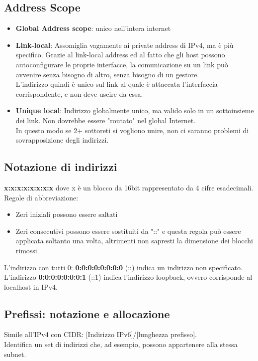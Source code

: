 \documentclass{article}
\begin{document}
\subsection{Address Scope}
\begin{itemize}
    \item \textbf{Global Address scope}: unico nell'intera internet
    \item \textbf{Link-local}: Assomiglia vagamente ai private address di IPv4, ma è più specifico. Grazie al link-local address ed al fatto che gli host possono autoconfigurare le proprie interfacce, la comunicazione su un link può avvenire senza bisogno di altro, senza bisogno di un gestore.\\
    L'indirizzo quindi è unico sul link al quale è attaccata l'interfaccia corrispondente, e non deve uscire da essa. 
    \item \textbf{Unique local}: Indirizzo globalmente unico, ma valido solo in un sottoinsieme dei link. Non dovrebbe essere "routato" nel global Internet.\\ 
    In questo modo se 2+ sottoreti si vogliono unire, non ci saranno problemi di sovrapposizione degli indirizzi.
\end{itemize}{}

\subsection{Notazione di indirizzi}
\textbf{x:x:x:x:x:x:x:x} dove x è un blocco da 16bit rappresentato da 4 cifre esadecimali.\\ Regole di abbreviazione:
\begin{itemize}
    \item Zeri iniziali possono essere saltati
    \item Zeri consecutivi possono essere sostituiti da "::" e questa regola può essere applicata soltanto una volta, altrimenti non sapresti la dimensione dei blocchi rimossi
\end{itemize}{}
L'indirizzo con tutti 0: \textbf{0:0:0:0:0:0:0:0} (::) indica un indirizzo non specificato.\\ L'indirizzo \textbf{0:0:0:0:0:0:0:1} (::1) indica l'indirizzo loopback, ovvero corrisponde al localhost in IPv4.

\subsection{Prefissi: notazione e allocazione}
Simile all'IPv4 con CIDR: [Indirizzo IPv6]/[lunghezza prefisso].\\
Identifica un set di indirizzi che, ad esempio, possono appartenere alla stessa subnet.
\end{document}
